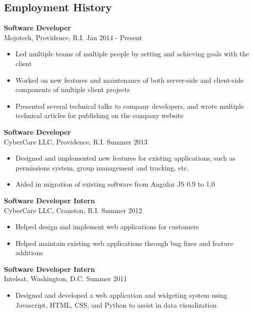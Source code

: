 \documentclass[margin]{res}
\begin{document}
\begin{resume}
\section{Employment History}
{\bf Software Developer} \\Mojotech, Providence, R.I. \hfill Jan 2014 - Present
\begin{itemize}
\item Led multiple teams of multiple people by setting and achieving goals with the client
\item Worked on new features and maintenance of both server-side and client-side components of multiple client projects
\item Presented several technical talks to company developers, and wrote multiple technical articles for publishing on the company website
\end{itemize}
{\bf Software Developer} \\CyberCare LLC, Providence, R.I. \hfill Summer 2013
\begin{itemize}
\item Designed and implemented new features for existing applications, such as permissions system, group management and tracking, etc.
\item Aided in migration of existing software from Angular JS 0.9 to 1.0
\end{itemize}
{\bf Software Developer Intern}\\CyberCare LLC, Cranston, R.I. \hfill Summer 2012
\begin{itemize}
\item Helped design and implement web applications for customers
\item Helped maintain existing web applications through bug fixes and feature additions
\end{itemize}
{\bf Software Developer Intern}\\Intelsat, Washington, D.C. \hfill Summer 2011
\begin{itemize}
\item Designed and developed a web application and widgeting system using Javascript, HTML, CSS, and Python to assist in data visualization
\end{itemize}

\end{resume} 
\end{document}
